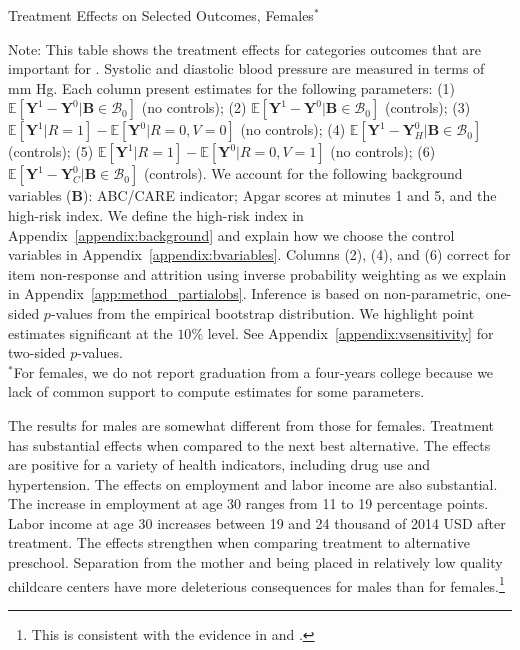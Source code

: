 \begin{table}
\centering
\begin{threeparttable}
\caption{Treatment Effects on Selected Outcomes, Females$^*$}\label{table:tescombinedfemales}
\begin{scriptsize}

\end{scriptsize}
\begin{tablenotes}
\scriptsize
Note: This table shows the treatment effects for categories outcomes that are important for \citet{Garcia_Heckman_Leaf_etal_2017_Comp_CBA_Unpublished}. Systolic and diastolic blood pressure are measured in terms of mm Hg. Each column present estimates for the following parameters: (1) $\mathbb{E} \left [ \bm{Y}^1 -  \bm{Y}^0 | \bm{B} \in \mathcal{B}_{0} \right]$ (no controls); (2) $\mathbb{E} \left [ \bm{Y}^1 -  \bm{Y}^0 | \bm{B} \in \mathcal{B}_{0} \right]$ (controls); (3) $\mathbb{E} \left [ \bm{Y}^1 | R = 1 \right] -  \mathbb{E} \left [ \bm{Y}^0 | R = 0,V = 0  \right]$ (no controls); (4) $\mathbb{E} \left [ \bm{Y}^1 -  \bm{Y}_H^0 | \bm{B} \in \mathcal{B}_{0} \right]$ (controls); (5) $\mathbb{E} \left [ \bm{Y}^1 | R = 1 \right] -  \mathbb{E} \left [ \bm{Y}^0 | R = 0,V = 1 \right]$ (no controls); (6) $\mathbb{E} \left [ \bm{Y}^1 -  \bm{Y}_C^0 | \bm{B} \in \mathcal{B}_{0} \right]$ (controls). We account for the following background variables ($\bm{B}$): ABC/CARE indicator; Apgar scores at minutes 1 and 5, and the high-risk index. We define the high-risk index in Appendix~\ref{appendix:background} and explain how we choose the control variables in Appendix~\ref{appendix:bvariables}. Columns (2), (4), and (6) correct for item non-response and attrition using inverse probability weighting as we explain in Appendix~\ref{app:method_partialobs}. Inference is based on non-parametric, one-sided $p$-values from the empirical bootstrap distribution. We highlight point estimates significant at the $10\%$ level. See Appendix~\ref{appendix:vsensitivity} for two-sided $p$-values.\\
$^*$For females, we do not report graduation from a four-years college because we lack of common support to compute estimates for some parameters.
\end{tablenotes}
\end{threeparttable}
\end{table}
\doublespacing

The results for males are somewhat different from those for females. Treatment has substantial effects when compared to the next best alternative. The effects are positive for a variety of health indicators, including drug use and hypertension. The effects on employment and labor income are also substantial. The increase in employment at age 30 ranges from 11 to 19 percentage points. Labor income at age 30 increases between 19 and 24 thousand of 2014 USD after treatment. The effects strengthen when comparing treatment to alternative preschool. Separation from the mother and being placed in relatively low quality childcare centers have more deleterious consequences for males than for females.\footnote{This is consistent with the evidence in \citet{Baker_Gruber_Milligan_2015_Noncog_Defects} and \citet{Kottelenberg-Lehrer_2014_Gender-Effects}.}

